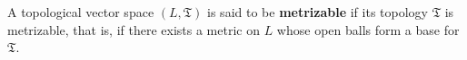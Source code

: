 A topological vector space $(L, \mathfrak{T})$ is said to be \textbf{metrizable} if its topology $\mathfrak{T}$ is metrizable, that is, if there exists a metric on $L$ whose open balls form a base for $\mathfrak{T}$.
